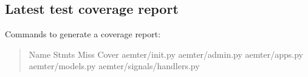 \documentclass[letterpaper,10pt,english]{sphinxmanual}
\begin{document}
\subsection{Latest test coverage report}
\label{\detokenize{masterCodeDoc:latest-test-coverage-report}}
Commands to generate a coverage report:
\begin{quote}
\begin{quote}

\begin{DUlineblock}{0em}
\item[] 
\item[] 
\end{DUlineblock}
\end{quote}
\def\sphinxLiteralBlockLabel{\label{\detokenize{masterCodeDoc:id14}}}
\begin{sphinxVerbatim}[commandchars=\\\{\}]
Name                                                      Stmts   Miss  Cover
\PYGZhy{}\PYGZhy{}\PYGZhy{}\PYGZhy{}\PYGZhy{}\PYGZhy{}\PYGZhy{}\PYGZhy{}\PYGZhy{}\PYGZhy{}\PYGZhy{}\PYGZhy{}\PYGZhy{}\PYGZhy{}\PYGZhy{}\PYGZhy{}\PYGZhy{}\PYGZhy{}\PYGZhy{}\PYGZhy{}\PYGZhy{}\PYGZhy{}\PYGZhy{}\PYGZhy{}\PYGZhy{}\PYGZhy{}\PYGZhy{}\PYGZhy{}\PYGZhy{}\PYGZhy{}\PYGZhy{}\PYGZhy{}\PYGZhy{}\PYGZhy{}\PYGZhy{}\PYGZhy{}\PYGZhy{}\PYGZhy{}\PYGZhy{}\PYGZhy{}\PYGZhy{}\PYGZhy{}\PYGZhy{}\PYGZhy{}\PYGZhy{}\PYGZhy{}\PYGZhy{}\PYGZhy{}\PYGZhy{}\PYGZhy{}\PYGZhy{}\PYGZhy{}\PYGZhy{}\PYGZhy{}\PYGZhy{}\PYGZhy{}\PYGZhy{}\PYGZhy{}\PYGZhy{}\PYGZhy{}\PYGZhy{}\PYGZhy{}\PYGZhy{}\PYGZhy{}\PYGZhy{}\PYGZhy{}\PYGZhy{}\PYGZhy{}\PYGZhy{}\PYGZhy{}\PYGZhy{}\PYGZhy{}\PYGZhy{}\PYGZhy{}\PYGZhy{}\PYGZhy{}\PYGZhy{}
aemter/\PYGZus{}\PYGZus{}init\PYGZus{}\PYGZus{}.py                                                     \PYGZpc{}
aemter/admin.py                                                       \PYGZpc{}
aemter/apps.py                                                         \PYGZpc{}
aemter/models.py                                                       \PYGZpc{}
aemter/signals/handlers.py                                             \PYGZpc{}

\end{sphinxVerbatim}
\end{quote}
\end{document}
